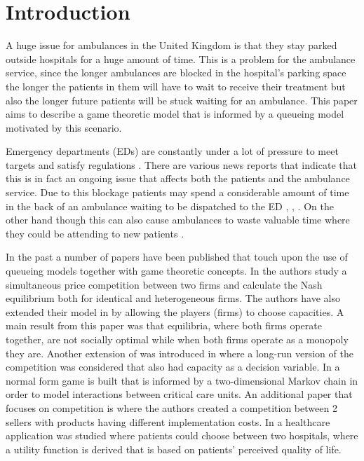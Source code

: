 \section{Introduction}

A huge issue for ambulances in the United Kingdom is that they stay 
parked outside hospitals for a huge amount of time. 
This is a problem for the ambulance service, since the longer ambulances are
blocked in the hospital's parking space the longer the patients in them will
have to wait to receive their treatment but also the longer future patients 
will be stuck waiting for an ambulance.
This paper aims to describe a game theoretic model that is informed by a 
queueing model motivated by this scenario.

Emergency departments (EDs) are constantly under a lot of pressure to meet 
targets and satisfy regulations \cite{EmergencyDepartmentWinterPressures}.
There are various news reports that indicate that this is in fact an ongoing 
issue that affects both the patients and the ambulance service.
Due to this blockage patients may spend a considerable amount of time in the 
back of an ambulance waiting to be dispatched to the ED \cite{mirror}, 
\cite{thenews}, \cite{bmj}.
On the other hand though this can also cause ambulances to waste valuable time 
where they could be attending to new patients \cite{eastanglia}.

In the past a number of papers have been published that touch upon the use of 
queueing models together with game theoretic concepts.
In \cite{FirmCompetition} the authors study a simultaneous price competition 
between two firms and calculate the Nash equilibrium both for identical and 
heterogeneous firms. 
The authors have also extended their model in \cite{FirmCompetition2} by 
allowing the players (firms) to choose capacities. 
A main result from this paper was that equilibria, where both firms operate
together, are not socially optimal while when both firms operate as a monopoly 
they are.
Another extension of \cite{FirmCompetition} was introduced in 
\cite{FirmCompetitionExtension} where a long-run version of the competition was 
considered that also had capacity as a decision variable.
In \cite{knight2017measuring} a normal form game is built that is informed by a 
two-dimensional Markov chain in order to model interactions between critical
care units.
An additional paper that focuses on competition is \cite{fan2009short} where
the authors created a competition between 2 sellers with products having 
different implementation costs.
In \cite{sadat2015can} a healthcare application was studied where patients 
could choose between two hospitals, where a utility function is derived that is
based on patients' perceived quality of life.

